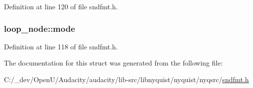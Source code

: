 Definition at line 120 of file sndfmt.\+h.

\subsubsection[{\texorpdfstring{mode}{mode}}]{ loop\+\_\+node\+::mode}\hypertarget{structloop__node_a7783fbce6ff355aa1bb32cd0b5416cc1}{}\label{structloop__node_a7783fbce6ff355aa1bb32cd0b5416cc1}


Definition at line 118 of file sndfmt.\+h.



The documentation for this struct was generated from the following file\+:\begin{DoxyCompactItemize}
\item 
C\+:/\+\_\+dev/\+Open\+U/\+Audacity/audacity/lib-\/src/libnyquist/nyquist/nyqsrc/\hyperlink{sndfmt_8h}{sndfmt.\+h}\end{DoxyCompactItemize}
